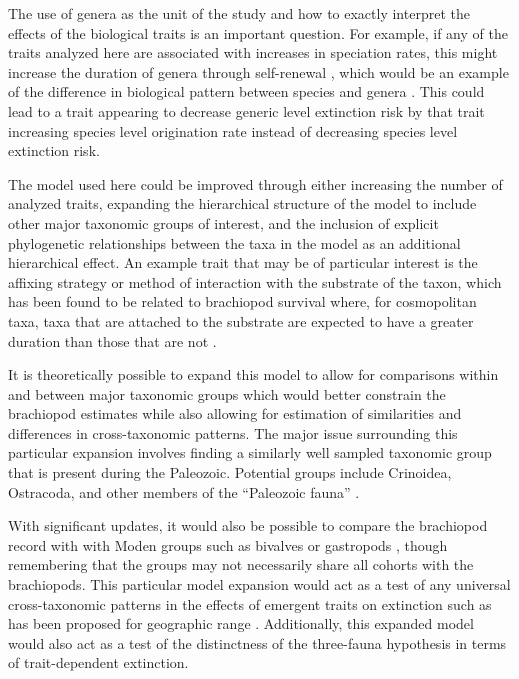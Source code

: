 \documentclass[11pt]{article}
\begin{document}
The use of genera as the unit of the study and how to exactly interpret the effects of the biological traits is an important question. For example, if any of the traits analyzed here are associated with increases in speciation rates, this might increase the duration of genera through self-renewal \citep{Raup1991b,Raup1994}, which would be an example of the difference in biological pattern between species and genera \citep{Jablonski1987,Jablonski2007,Jablonski2008a}. This could lead to a trait appearing to decrease generic level extinction risk by that trait increasing species level origination rate instead of decreasing species level extinction risk. %

The model used here could be improved through either increasing the number of analyzed traits, expanding the hierarchical structure of the model to include other major taxonomic groups of interest, and the inclusion of explicit phylogenetic relationships between the taxa in the model as an additional hierarchical effect. An example trait that may be of particular interest is the affixing strategy or method of interaction with the substrate of the taxon, which has been found to be related to brachiopod survival where, for cosmopolitan taxa, taxa that are attached to the substrate are expected to have a greater duration than those that are not \citep{Alexander1977}.

It is theoretically possible to expand this model to allow for comparisons within and between major taxonomic groups which would better constrain the brachiopod estimates while also allowing for estimation of similarities and differences in cross-taxonomic patterns. The major issue surrounding this particular expansion involves finding a similarly well sampled taxonomic group that is present during the Paleozoic. Potential groups include Crinoidea, Ostracoda, and other members of the ``Paleozoic fauna'' \citep{Sepkoski1981a}.

With significant updates, it would also be possible to compare the brachiopod record with with Moden groups such as bivalves or gastropods \citep{Sepkoski1981a}, though remembering that the groups may not necessarily share all cohorts with the brachiopods. This particular model expansion would act as a test of any universal cross-taxonomic patterns in the effects of emergent traits on extinction such as has been proposed for geographic range \citep{Payne2007}. Additionally, this expanded model would also act as a test of the distinctness of the \citet{Sepkoski1981a} three-fauna hypothesis in terms of trait-dependent extinction.
\end{document}
